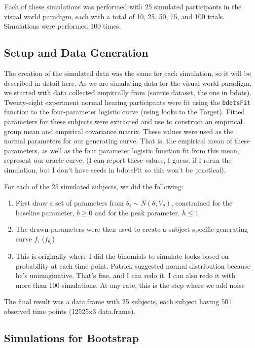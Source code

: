 \documentclass{article}
\begin{document}
Each of these simulations was performed with 25 simulated participants in the visual world paradigm, each with a total of 10, 25, 50, 75, and 100 trials. Simulations were performed 100 times. 

\subsection{Setup and Data Generation}

The creation of the simulated data was the same for each simulation, so it will be described in detail here. As we are simulating data for the visual world paradigm, we started with data collected empircally from (source dataset, the one in bdots). Twenty-eight experiment normal hearing participants were fit using the \texttt{bdotsFit} function to the four-parameter logistic curve (using looks to the Target). Fitted parameters for these subjects were extracted and use to construct an empirical group mean and empirical covariance matrix. These values were used as the normal parameters for our generating curve. That is, the empirical mean of these parameters, as well as the four parameter logistic function fit from this mean, represent our oracle curve. (I can report these values, I guess, if I rerun the simulation, but I don't have seeds in bdotsFit so this won't be practical).

For each of the 25 simulated subjects, we did the following:

\begin{enumerate}
	\item First draw a set of parameters from $\theta_i \sim N(\theta, V_{\theta})$, constrained for the baseline parameter, $b \geq 0$ and for the peak parameter, $h \leq 1$
	\item The drawn parameters were then used to create a subject specific generating curve $f_i$ ($f_{\theta_i}$)
	\item This is originally where I did the binomials to simulate looks based on probability at each time point. Patrick suggested normal distribution because he's unimaginative. That's fine, and I can redo it. I can also redo it with more than 100 simulations. At any rate, this is the step where we add noise
\end{enumerate}


The final result was a data.frame with 25 subjects, each subject having 501 observed time points (12525x3 data.frame). 

\subsection{Simulations for Bootstrap}
\end{document}
